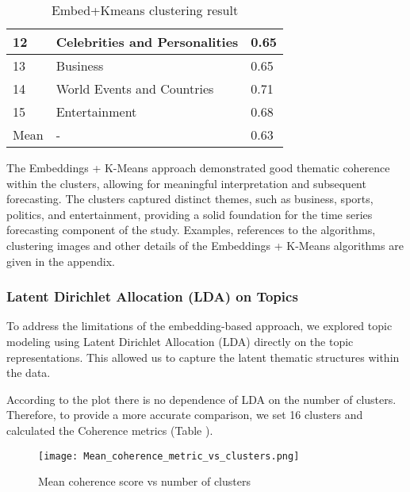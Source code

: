 \begin{table}[h]
\begin{tabular}{|l|l|l|}
12                                        & Celebrities and Personalities                                   & 0.65                                    \\ \hline
13                                        & Business                                                        & 0.65                                    \\ \hline
14                                        & World Events and Countries                                      & 0.71                                    \\ \hline
15                                        & Entertainment                                                   & 0.68                                    \\ \hline
Mean                                      & -                                                               & 0.63                                    \\ \hline
\end{tabular}
\caption{Embed+Kmeans clustering result}
\label{tab:KmeansClusters}
\end{table}








The Embeddings + K-Means approach demonstrated good thematic coherence within the clusters, allowing for meaningful interpretation and subsequent forecasting. The clusters captured distinct themes, such as business, sports, politics, and entertainment, providing a solid foundation for the time series forecasting component of the study.
Examples, references to the algorithms, clustering images and other details of the Embeddings + K-Means algorithms are given in the appendix.


\subsubsection{Latent Dirichlet Allocation (LDA) on Topics}

To address the limitations of the embedding-based approach, we explored topic modeling using Latent Dirichlet Allocation (LDA) \cite{blei2003latent} directly on the topic representations. This allowed us to capture the latent thematic structures within the data.

According to the plot there is no dependence of LDA on the number of clusters. Therefore, to provide a more accurate comparison, we set 16 clusters and calculated the Coherence metrics (Table ). 
\begin{figure}[h] 
    \centering
    \texttt{[image: Mean\_coherence\_metric\_vs\_clusters.png]}
    \label{fig:MeanCohKMeans}
    \caption{Mean coherence score vs number of clusters}
\end{figure}

